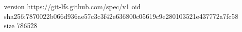 version https://git-lfs.github.com/spec/v1
oid sha256:7870022b066d936ae57c3c3f42e636800c05619c9e280103521e437772a7fc58
size 786528

